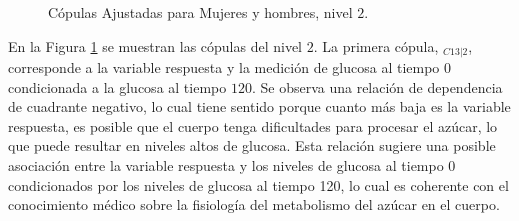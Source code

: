 \begin{figure}[H]
 \centering
    \caption{Cópulas Ajustadas para Mujeres y hombres, nivel $2$.}
    \label{fig:Modelo4TotalNivel2}
\end{figure}

En la Figura \ref{fig:Modelo4TotalNivel2} se muestran las cópulas del nivel $2$. La primera cópula, $_{C13|2}$, corresponde a la variable respuesta y la medición de glucosa al tiempo $0$ condicionada a la glucosa al tiempo $120$. Se observa una relación de dependencia de cuadrante negativo, lo cual tiene sentido porque cuanto más baja es la variable respuesta, es posible que el cuerpo tenga dificultades para procesar el azúcar, lo que puede resultar en niveles altos de glucosa. Esta relación sugiere una posible asociación entre la variable respuesta y los niveles de glucosa al tiempo $0$ condicionados por los niveles de glucosa al tiempo 120, lo cual es coherente con el conocimiento médico sobre la fisiología del metabolismo del azúcar en el cuerpo.


